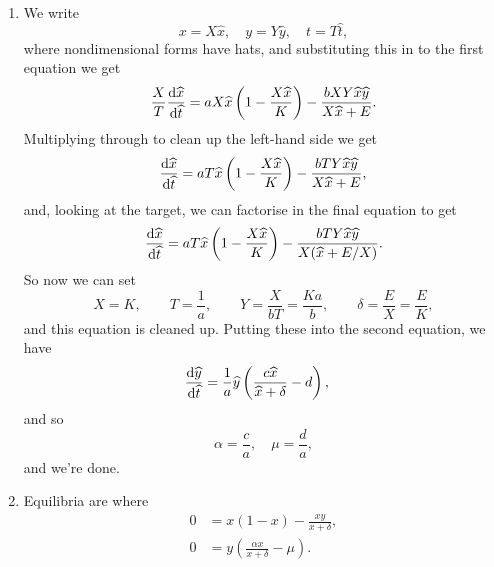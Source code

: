 \documentclass[a4paper, 12pt]{article}
\begin{document}
\begin{enumerate}[label={\bf \arabic{*}.\;}, ref={\arabic{*}},itemsep=3ex, left=0ex]
{\begin{enumerate}[label=(\alph*)]
        \item %
          We write
          \begin{equation}
            x = X\hat{x}, \quad y = Y\hat{y}, \quad t = T\hat{t},
          \end{equation}
          where nondimensional forms have hats, and substituting this in to the first equation we get
          \begin{equation}
            \frac{X}{T}\fd{\hat{x}}{\hat{t}} = aX\hat{x}\left(1-\frac{X\hat{x}}{K}\right) - \frac{bXY\hat{x}\hat{y}}{X\hat{x}+E}.
          \end{equation}
          Multiplying through to clean up the left-hand side we get
          \begin{equation}
            \fd{\hat{x}}{\hat{t}} = aT\hat{x}\left(1-\frac{X\hat{x}}{K}\right) - \frac{bTY\hat{x}\hat{y}}{X\hat{x}+E},
          \end{equation}
          and, looking at the target, we can factorise in the final equation to get
          \begin{equation}
            \fd{\hat{x}}{\hat{t}} = aT\hat{x}\left(1-\frac{X\hat{x}}{K}\right) - \frac{bTY\hat{x}\hat{y}}{X(\hat{x}+E/X)}.
          \end{equation}
          So now we can set
          \begin{equation}
            X=K, \qquad T = \frac{1}{a}, \qquad Y = \frac{X}{bT} = \frac{Ka}{b}, \qquad \delta = \frac{E}{X} = \frac{E}{K},
          \end{equation}
          and this equation is cleaned up. Putting these into the second equation, we have
          \begin{align*}
            \fd{\hat{y}}{\hat{t}} &= \frac{1}{a}\hat{y} \left( \frac{c\hat{x}}{\hat{x}+\delta} - d \right),
          \end{align*}
          and so
          \begin{equation}
            \alpha = \frac{c}{a}, \quad \mu = \frac{d}{a},
          \end{equation}
          and we're done.

        \item %
          Equilibria are where
          \begin{align}
            0 &= x(1-x) - \frac{xy}{x+\delta}, \label{eq1}\\
            0 &= y\left(\frac{\alpha x}{x + \delta} - \mu \right) \label{eq2}.
          \end{align}


\end{enumerate}}
\end{enumerate}
\end{document}
